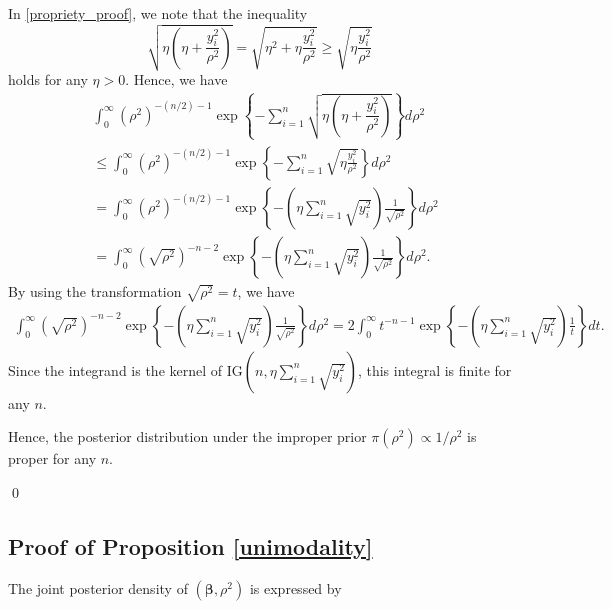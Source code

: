 \documentclass[11pt]{article}
\theoremstyle{plain}
\theoremstyle{definition}
\begin{document}
In \eqref{propriety_proof}, we note that the inequality 
\[\sqrt{\eta\left(\eta+\dfrac{y_{i}^2}{\rho^{2}}\right)}=\sqrt{\eta^2 +\eta \frac{y_i^2}{\rho^2}} \ge \sqrt{\eta \frac{y_i^2}{\rho^2}}\]
holds for any $\eta>0$. Hence, we have
\begin{align*}
&\int_0^{\infty}(\rho^2)^{-(n/2)-1} \exp\left\{-\sum_{i=1}^n\sqrt{\eta\left(\eta+\dfrac{y_{i}^2}{\rho^{2}}\right)}\right\}d\rho^2\\
& \le \int_0^{\infty}(\rho^2)^{-(n/2)-1} \exp\left\{-\sum_{i=1}^n \sqrt{\eta \frac{y_i^2}{\rho^2}}\right\}d\rho^2\\
&= \int_0^{\infty}(\rho^2)^{-(n/2)-1} \exp\left\{-\left(\eta\sum_{i=1}^n \sqrt{y_i^2} \right) \frac{1}{\sqrt{\rho^2}}\right\}d\rho^2\\
&= \int_0^{\infty}(\sqrt{\rho^2})^{-n-2} \exp\left\{-\left(\eta\sum_{i=1}^n \sqrt{y_i^2} \right) \frac{1}{\sqrt{\rho^2}}\right\}d\rho^2.
\end{align*}
By using the transformation $\sqrt{\rho^2} = t$, we have
\begin{align*}
\int_0^{\infty}(\sqrt{\rho^2})^{-n-2} \exp\left\{-\left(\eta\sum_{i=1}^n \sqrt{y_i^2} \right) \frac{1}{\sqrt{\rho^2}}\right\}d\rho^2=2\int_0^{\infty}t^{-n-1} \exp\left\{-\left(\eta\sum_{i=1}^n \sqrt{y_i^2} \right) \frac{1}{t}\right\}dt.
\end{align*}
Since the integrand is the kernel of $\mathrm{IG}(n, \eta\sum_{i=1}^n \sqrt{y_i^2})$, this integral is finite for any $n$.

Hence, the posterior distribution under the improper prior $\pi(\rho^2) \propto 1/\rho^2$ is proper for any $n$.

\qed


\subsection*{Proof of Proposition \ref{unimodality}}

The joint posterior density of $(\bm\beta,\rho^{2})$ is expressed by
\end{document}
